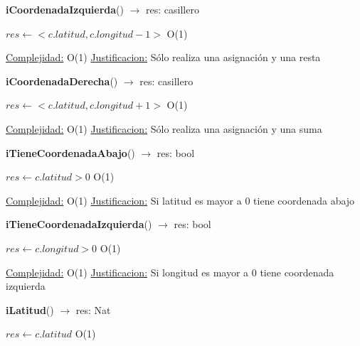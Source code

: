 \begin{Algoritmos}
\begin{algorithm}[H]{\textbf{iCoordenadaIzquierda}() $\to$ res: casillero}
	\begin{algorithmic}[1]
		\State $res \gets <c.latitud, c.longitud - 1>$ \Comment O(1)
		
		\medskip
		\Statex \underline{Complejidad:} O(1)
			\Statex \underline{Justificacion:} Sólo realiza una asignación y una resta
	\end{algorithmic}
\end{algorithm}


\begin{algorithm}[H]{\textbf{iCoordenadaDerecha}() $\to$ res: casillero}
	\begin{algorithmic}[1]
		\State $res \gets <c.latitud, c.longitud + 1>$ \Comment O(1)
		
		\medskip
		\Statex \underline{Complejidad:} O(1)
			\Statex \underline{Justificacion:} Sólo realiza una asignación y una suma
	\end{algorithmic}
\end{algorithm}

\begin{algorithm}[H]{\textbf{iTieneCoordenadaAbajo}() $\to$ res: bool}
	\begin{algorithmic}[1]
		\State $res \gets c.latitud > 0$ \Comment O(1)
		
		\medskip
		\Statex \underline{Complejidad:} O(1)
			\Statex \underline{Justificacion:} Si latitud es mayor a 0 tiene coordenada abajo
	\end{algorithmic}
\end{algorithm}

\begin{algorithm}[H]{\textbf{iTieneCoordenadaIzquierda}() $\to$ res: bool}
	\begin{algorithmic}[1]
		\State $res \gets c.longitud > 0$ \Comment O(1)
		
		\medskip
		\Statex \underline{Complejidad:} O(1)
			\Statex \underline{Justificacion:} Si longitud es mayor a 0 tiene coordenada izquierda
	\end{algorithmic}
\end{algorithm}


\begin{algorithm}[H]{\textbf{iLatitud}() $\to$ res: Nat}
	\begin{algorithmic}[1]
		\State $res \gets c.latitud$ \Comment O(1)
		

\end{algorithmic}
\end{algorithm}
\end{Algoritmos}
